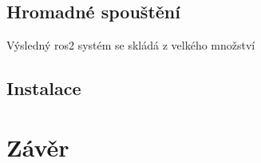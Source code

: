 \section{Hromadné spouštění}
Výsledný ros2 systém se skládá z velkého množství 

\section{Instalace}

\chapter{Závěr}


%
